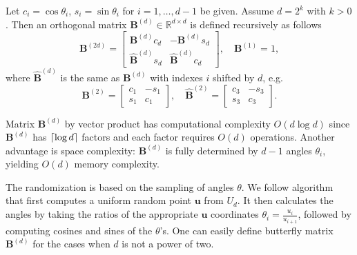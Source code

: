\begin{definition}
    Let $c_i = \cos\theta_i$, $s_i = \sin\theta_i$ for $i = 1,\dots,d-1$ be given. Assume $d=2^k$ with $k > 0$. Then an orthogonal matrix $\mathbf{B}^{(d)} \in \mathbb{R}^{d \times d}$ is defined recursively as follows
    \begin{equation*}
    \mathbf{B}^{(2d)} =
    \begin{bmatrix}
        \mathbf{B}^{(d)}c_d & -\mathbf{B}^{(d)}s_d \\
        \mathbf{\hat{B}}^{(d)}s_d & \mathbf{\hat{B}}^{(d)}c_d
    \end{bmatrix},
    \quad \mathbf{B}^{(1)} = 1,
    \end{equation*}
    where $\mathbf{\hat{B}}^{(d)}$ is the same as $\mathbf{B}^{(d)}$ with indexes $i$ shifted by $d$, e.g.
    \begin{equation*}
    \mathbf{B}^{(2)} =
    \begin{bmatrix}
        c_1 & -s_1 \\
        s_1 & c_1
    \end{bmatrix},
    \quad
    \mathbf{\hat{B}}^{(2)} =
    \begin{bmatrix}
        c_3 & -s_3 \\
        s_3 & c_3
    \end{bmatrix}.
    \end{equation*}

\end{definition}
Matrix $\mathbf{B}^{(d)}$ by vector product has computational complexity $O(d\log d)$ since $\mathbf{B}^{(d)}$ has $\lceil\log d\rceil$ factors and each factor requires $O(d)$ operations. Another advantage is space complexity: $\mathbf{B}^{(d)}$ is fully determined by $d-1$ angles $\theta_i$, yielding $O(d)$ memory complexity.

The randomization is based on the sampling of angles $\theta$.
We follow \citep{fang1997some} algorithm that first computes a uniform random point $\mathbf{u}$ from $U_d$. It then calculates the angles by taking the ratios of the appropriate $\mathbf{u}$ coordinates $\theta_i = \frac{u_i}{u_{i+1}}$, followed by computing cosines and sines of the $\theta$'s.
One can easily define butterfly matrix $\mathbf{B}^{(d)}$ for the cases when $d$ is not a power of two.

